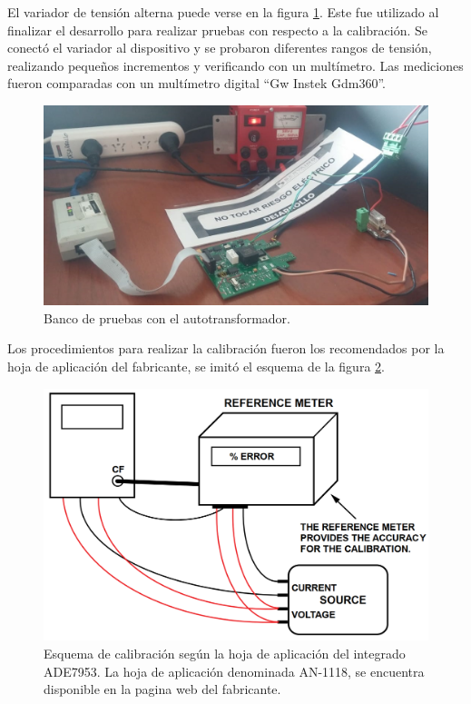 El variador de tensión alterna puede verse en la figura \ref{fig:BancCalib}. Este fue utilizado al finalizar el desarrollo para realizar pruebas con respecto a la calibración. Se conectó el variador al dispositivo y se probaron diferentes rangos de tensión, realizando pequeños incrementos y verificando con un multímetro. Las mediciones fueron comparadas con un multímetro digital \textquotedblleft Gw Instek Gdm360\textquotedblright.

\begin{figure}[!htb]
	\centering
	\includegraphics[width=\textwidth ,keepaspectratio]{Figures/BancoCalib.jpg}
	\caption{ Banco de pruebas con el autotransformador.}
	\label{fig:BancCalib}
\end{figure}

Los procedimientos para realizar la calibración fueron los recomendados por la hoja de aplicación del fabricante, se imitó el esquema de la figura \ref{fig:SquemCalib}.

\begin{figure}[!htb]
	\centering
	\includegraphics[width=120mm ,keepaspectratio]{Figures/HojadeAplicacion.png}
	\caption{ Esquema de calibración según la hoja de aplicación del integrado ADE7953. La hoja de aplicación denominada AN-1118, se encuentra disponible en la pagina web del fabricante\protect\footnotemark .}
	\label{fig:SquemCalib}
\end{figure}

